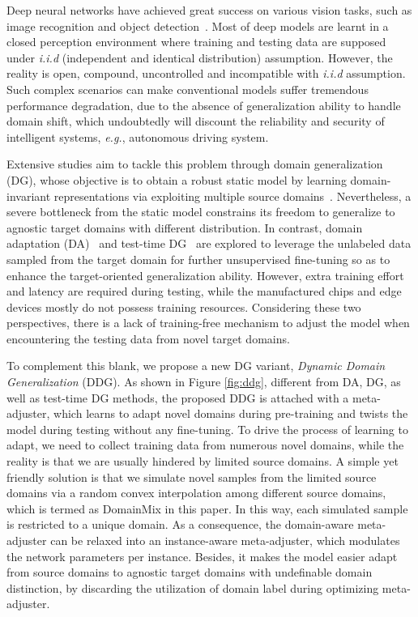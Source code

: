 \documentclass{article}
\begin{document}
Deep neural networks have achieved great success on various vision tasks, such as image recognition and object detection~\cite{resnet}. Most of deep models are learnt in a closed perception environment where training and testing data are supposed under \emph{i.i.d} (independent and identical distribution) assumption. However, the reality is open, compound, uncontrolled and incompatible with \emph{i.i.d} assumption. Such complex scenarios can make conventional models suffer tremendous performance degradation, due to the absence of generalization ability to handle domain shift, which undoubtedly will discount the reliability and security of intelligent systems, \emph{e.g.}, autonomous driving system.

Extensive studies aim to tackle this problem through domain generalization (DG), whose objective is to obtain a robust static model by learning domain-invariant representations via exploiting multiple source domains~\cite{dann,mixstyle}. Nevertheless, a severe bottleneck from the static model constrains its freedom to generalize to agnostic target domains with different distribution. In contrast, domain adaptation (DA)~\cite{ganin2016domain} and test-time DG~\cite{iwasawa2021test} are explored to leverage the unlabeled data sampled from the target domain for further unsupervised fine-tuning so as to enhance the target-oriented generalization ability. However, extra training effort and latency are required during testing, while the manufactured chips and edge devices mostly do not possess training resources. Considering these two perspectives, there is a lack of training-free mechanism to adjust the model when encountering the testing data from novel target domains. 

To complement this blank, we propose a new DG variant, \emph{Dynamic Domain Generalization} (DDG). As shown in Figure \ref{fig:ddg}, different from DA, DG, as well as test-time DG methods, the proposed DDG is attached with a meta-adjuster, which learns to adapt novel domains during pre-training and twists the model during testing without any fine-tuning. To drive the process of learning to adapt, we need to collect training data from numerous novel domains, while the reality is that we are usually hindered by limited source domains. A simple yet friendly solution is that we simulate novel samples from the limited source domains via a random convex interpolation among different source domains, which is termed as DomainMix in this paper. In this way, each simulated sample is restricted to a unique domain. As a consequence, the domain-aware meta-adjuster can be relaxed into an instance-aware meta-adjuster, which modulates the network parameters per instance. Besides, it makes the model easier adapt from source domains to agnostic target domains with undefinable domain distinction, by discarding the utilization of domain label during optimizing meta-adjuster.
\end{document}
